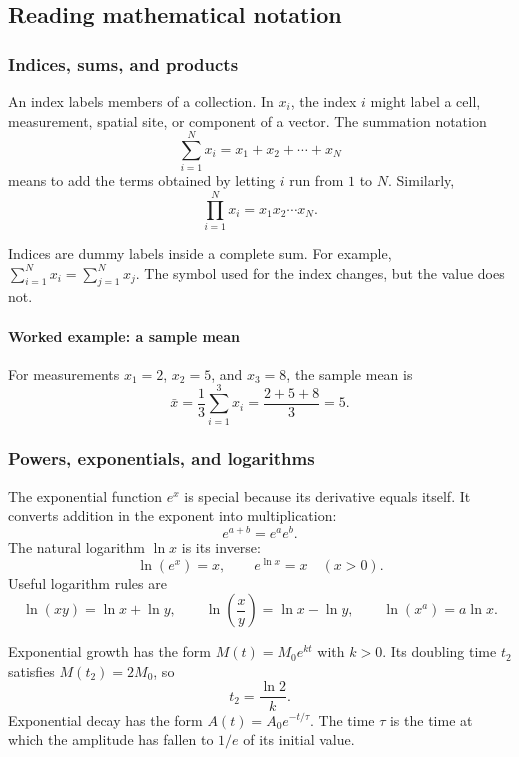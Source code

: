 \subsection{Reading mathematical notation}
\label{math:language}

\subsubsection{Indices, sums, and products}

An index labels members of a collection.
In $x_i$, the index $i$ might label a cell, measurement, spatial site, or component of a vector.
The summation notation
\[
    \sum_{i=1}^{N}x_i=x_1+x_2+\cdots+x_N
\]
means to add the terms obtained by letting $i$ run from $1$ to $N$.
Similarly,
\[
    \prod_{i=1}^{N}x_i=x_1x_2\cdots x_N.
\]

Indices are dummy labels inside a complete sum.
For example, $\sum_{i=1}^{N}x_i=\sum_{j=1}^{N}x_j$.
The symbol used for the index changes, but the value does not.

\paragraph{Worked example: a sample mean}
For measurements $x_1=2$, $x_2=5$, and $x_3=8$, the sample mean is
\[
    \bar{x}=\frac{1}{3}\sum_{i=1}^{3}x_i=\frac{2+5+8}{3}=5.
\]

\subsubsection{Powers, exponentials, and logarithms}

The exponential function $e^x$ is special because its derivative equals itself.
It converts addition in the exponent into multiplication:
\[
    e^{a+b}=e^ae^b.
\]
The natural logarithm $\ln x$ is its inverse:
\[
    \ln(e^x)=x, \qquad e^{\ln x}=x \quad (x>0).
\]
Useful logarithm rules are
\[
    \ln(xy)=\ln x+\ln y, \qquad \ln\left(\frac{x}{y}\right)=\ln x-\ln y, \qquad \ln(x^a)=a\ln x.
\]

Exponential growth has the form $M(t)=M_0e^{kt}$ with $k>0$.
Its doubling time $t_2$ satisfies $M(t_2)=2M_0$, so
\[
    t_2=\frac{\ln2}{k}.
\]
Exponential decay has the form $A(t)=A_0e^{-t/\tau}$.
The time $\tau$ is the time at which the amplitude has fallen to $1/e$ of its initial value.



